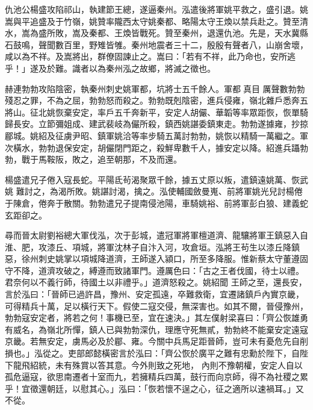 \begin{pinyinscope}
 仇池公楊盛攻陷祁山，執建節王總，遂逼秦州。泓遣後將軍姚平救之，盛引退。姚嵩與平追盛及于竹嶺，姚贊率隴西太守姚秦都、略陽太守王煥以禁兵赴之。贊至清水，嵩為盛所敗，嵩及秦都、王煥皆戰死。贊至秦州，退還仇池。先是，天水冀縣石鼓鳴，聲聞數百里，野雉皆雊。秦州地震者三十二，殷殷有聲者八，山崩舍壞，咸以為不祥。及嵩將出，群僚固諫止之。嵩曰：「若有不祥，此乃命也，安所逃乎！」遂及於難。識者以為秦州泓之故鄉，將滅之徵也。



 赫連勃勃攻陷陰密，執秦州刺史姚軍都，坑將士五千餘人。軍都真目
 厲聲數勃勃殘忍之罪，不為之屈，勃勃怒而殺之。勃勃既剋陰密，進兵侵雍，嶺北雜戶悉奔五將山。征北姚恢棄安定，率戶五千奔新平，安定人胡儼、華韜等率眾距恢，恢單騎歸長安。立節彌姐成、建武裴岐為儼所殺，鎮西姚諶委鎮東走。勃勃遂據雍，抄掠郿城。姚紹及征虜尹昭、鎮軍姚洽等率步騎五萬討勃勃，姚恢以精騎一萬繼之。軍次橫水，勃勃退保安定，胡儼閉門距之，殺鮮卑數千人，據安定以降。紹進兵躡勃勃，戰于馬鞍阪，敗之，追至朝那，不及而還。



 楊盛遣兄子倦入寇長蛇。平陽氐茍渴聚眾千餘，據五丈原以叛，遣鎮遠姚萬、恢武姚
 難討之，為渴所敗。姚諶討渴，擒之。泓使輔國斂曼嵬、前將軍姚光兒討楊倦于陳倉，倦奔于散關。勃勃遣兄子提南侵池陽，車騎姚裕、前將軍彭白狼、建義蛇玄距卻之。



 尋而晉太尉劉裕總大軍伐泓，次于彭城，遣冠軍將軍檀道濟、龍驤將軍王鎮惡入自淮、肥，攻漆丘、項城，將軍沈林子自汴入河，攻倉垣。泓將王茍生以漆丘降鎮惡，徐州刺史姚掌以項城降道濟，王師遂入潁口，所至多降服。惟新蔡太守董遵固守不降，道濟攻破之，縛遵而致諸軍門。遵厲色曰：「古之王者伐國，待士以禮。君奈何以不義行師，待國土以非禮乎。」道濟怒殺之。姚紹聞
 王師之至，還長安，言於泓曰：「晉師已過許昌，豫州、安定孤遠，卒難救衛，宜遷諸鎮戶內實京畿，可得精兵十萬，足以橫行天下。假使二寇交侵，無深害也。如其不爾，晉侵豫州，勃勃寇安定者，將若之何！事機已至，宜在速決。」其左僕射梁喜曰：「齊公恢雄勇有威名，為嶺北所憚，鎮人已與勃勃深仇，理應守死無貳，勃勃終不能棄安定遠寇京畿。若無安定，虜馬必及於郿、雍。今關中兵馬足距晉師，豈可未有憂危先自削損也。」泓從之。吏部郎懿橫密言於泓曰：「齊公恢於廣平之難有忠勳於陛下，自陛下龍飛紹統，未有殊賞以答其意。今外則致之死地，
 內則不豫朝權，安定人自以孤危逼寇，欲思南遷者十室而九，若擁精兵四萬，鼓行而向京師，得不為社稷之累乎！宜徵還朝廷，以慰其心。」泓曰：「恢若懷不逞之心，征之適所以速禍耳。」又不從。




\end{pinyinscope}
